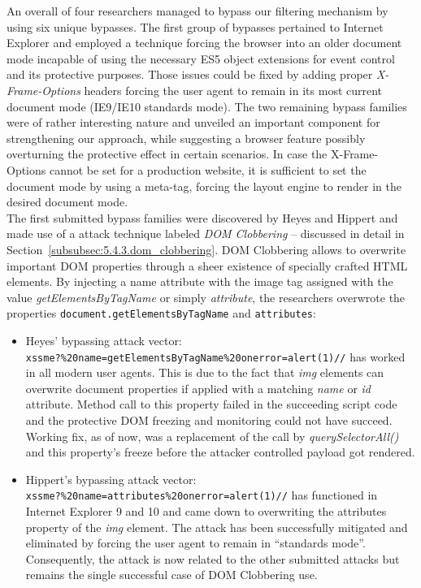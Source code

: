       An overall of four researchers managed to bypass our filtering mechanism by using six unique bypasses. The first group of bypasses pertained to Internet Explorer and employed a technique forcing the browser into an older document mode incapable of using the necessary ES5 object extensions for event control and its protective purposes. Those issues could be fixed by adding proper \textit{X-Frame-Options} headers forcing the user agent to remain in its most current document mode (IE9/IE10 standards mode). The two remaining bypass families were of rather interesting nature and unveiled an important component for strengthening our approach, while suggesting a browser feature possibly overturning the protective effect in certain scenarios. In case the X-Frame-Options cannot be set for a production website, it is sufficient to set the document mode by using a meta-tag, forcing the layout engine to render in the desired document mode. \\

      The first submitted bypass families were discovered by Heyes and Hippert and made use of a attack technique labeled \textit{DOM Clobbering} -- discussed in detail in Section~\ref{subsubsec:5.4.3.dom_clobbering}. DOM Clobbering allows to overwrite important DOM properties through a sheer existence of specially crafted HTML elements. By injecting a name attribute with the image tag assigned with the value \textit{getElementsByTagName} or simply \textit{attribute}, the researchers overwrote the properties \texttt{document.getElementsByTagName} and \texttt{attributes}:

      \begin{itemize}
        \item Heyes' bypassing attack vector: \\ \texttt{xssme?\%20name=getElementsByTagName\%20onerror=alert(1)//} has worked in all modern user agents. This is due to the fact that \textit{img} elements can overwrite document properties if applied with a matching \textit{name} or \textit{id} attribute. Method call to this property failed in the succeeding script code and the protective DOM freezing and monitoring could not have succeed. 
        Working fix, as of now, was a replacement of the call by \textit{querySelectorAll()} and this property's freeze before the attacker controlled payload got rendered. 
	\item Hippert's bypassing attack vector:\\ \texttt{xssme?\%20name=attributes\%20onerror=alert(1)//} has functioned in Internet Explorer 9 and 10 and came down to overwriting the attributes property of the \textit{img} element. The attack has been successfully mitigated and eliminated by forcing the user agent to remain in ``standards mode''. Consequently, the attack is now related to the other submitted attacks but remains the single successful case of DOM Clobbering use.
      \end{itemize}

